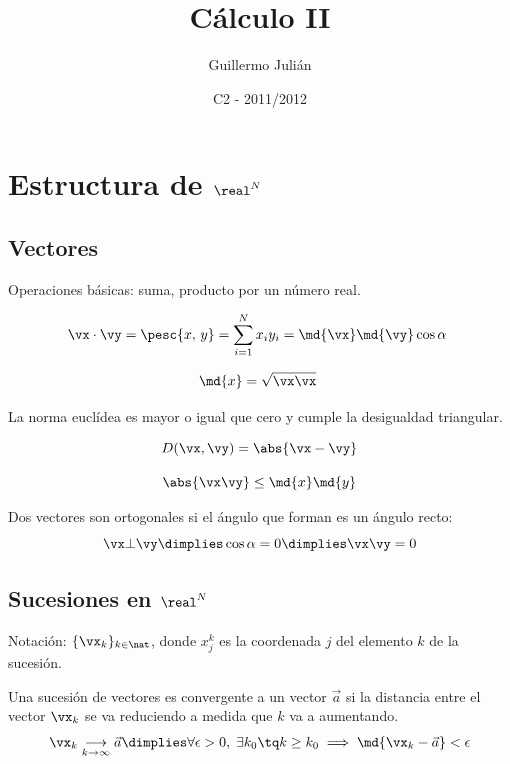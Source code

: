 \documentclass[nochap]{apuntes}
\author{Guillermo Julián}
\date{C2 - 2011/2012}
\title{Cálculo II}
\begin{document}
\pagestyle{plain}
\maketitle
\newpage

\tableofcontents

\newpage

\section{Estructura de $\real^N$}

\subsection{Vectores}

Operaciones básicas: suma, producto por un número real.

\begin{defn}
\[ \vx\cdot\vy=\pesc{x,\,y} = \sum_{i=1}^Nx_iy_i = \md{\vx}\md{\vy}\cos \alpha \]
\end{defn}

\begin{defn}
\[ \md{x} = \sqrt{\vx\vx} \]
\end{defn}

La norma euclídea es mayor o igual que cero y cumple la desigualdad triangular.

\begin{defn}
\[ D(\vx , \vy) = \abs{\vx - \vy} \]
\end{defn}

\begin{theorem}
\[\abs{\vx\vy}\leq\md{x}\md{y}\]
\end{theorem}

\begin{defn}[Ortogonalidad]
Dos vectores son ortogonales si el ángulo que forman es un ángulo recto:
\[ \vx\bot\vy \dimplies \cos \alpha = 0 \dimplies \vx\vy = 0\]
\end{defn}

\subsection{Sucesiones en $\real^N$}

Notación: $\{\vx_k\}_{k\in\nat}$, donde $x_j^k$ es la coordenada $j$ del elemento $k$ de la sucesión.

\begin{defn} Una sucesión de vectores es convergente a un vector $\vec{a}$ si la distancia entre el vector $\vx_k$ se va reduciendo a medida que $k$ va a aumentando.
\[\vx_k \underset{k\to\infty}{\longrightarrow} \vec{a} \dimplies \forall \epsilon >0,\; \exists k_0 \tq k\geq k_0 \implies \md{\vx_k - \vec{a}} < \epsilon \]
\end{defn}
\end{document}
